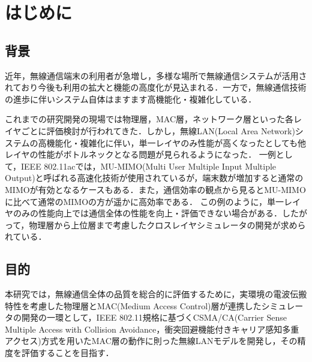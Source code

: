 \documentclass[a4paper,10pt]{ltjsarticle}
\begin{document}

\tableofcontents
\thispagestyle{empty}



\clearpage
\setcounter{page}{1}

\section{はじめに}
\subsection{背景}

近年，無線通信端末の利用者が急増し，多様な場所で無線通信システムが活用されており今後も利用の拡大と機能の高度化が見込まれる．一方で，無線通信技術の進歩に伴いシステム自体はますます高機能化・複雑化している．


これまでの研究開発の現場では物理層，MAC層，ネットワーク層といった各レイヤごとに評価検討が行われてきた．しかし，無線LAN(Local Area Network)システムの高機能化・複雑化に伴い，単一レイヤのみ性能が高くなったとしても他レイヤの性能がボトルネックとなる問題が見られるようになった．
一例として，IEEE 802.11ac\cite{11std}では，MU-MIMO(Multi User Multiple Input Multiple Output)と呼ばれる高速化技術が使用されているが，端末数が増加すると通常のMIMOが有効となるケースもある．また，通信効率の観点から見るとMU-MIMOに比べて通常のMIMOの方が遥かに高効率である\cite{book1}．
この例のように，単一レイヤのみの性能向上では通信全体の性能を向上・評価できない場合がある．したがって，物理層から上位層まで考慮したクロスレイヤシミュレータの開発が求められている．

\subsection{目的}

本研究では，無線通信全体の品質を総合的に評価するために，実環境の電波伝搬特性を考慮した物理層とMAC(Medium Access Control)層が連携したシミュレータの開発の一環として，IEEE 802.11規格\cite{11std}に基づくCSMA/CA(Carrier Sense Multiple Access with Collision Avoidance，衝突回避機能付きキャリア感知多重アクセス)方式を用いたMAC層の動作に則った無線LANモデルを開発し，その精度を評価することを目指す．
\end{document}
